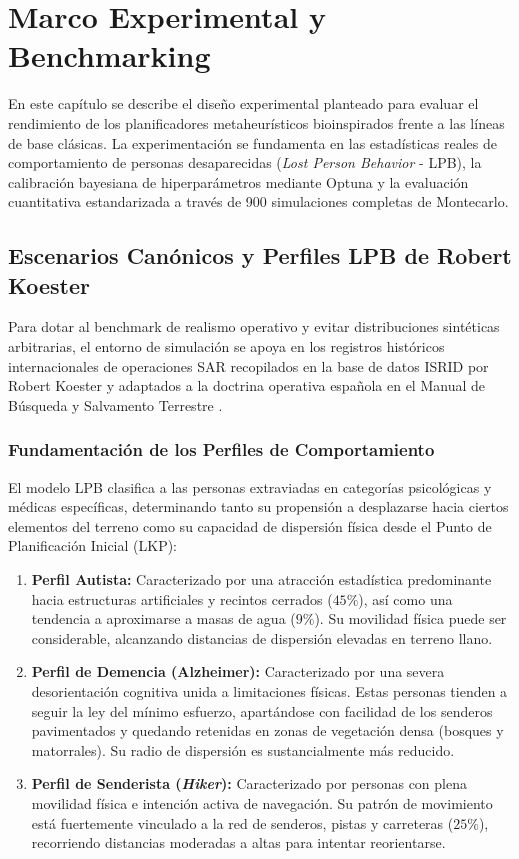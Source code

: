 \chapter{Marco Experimental y Benchmarking}
\label{ch:experimentacion}

En este capítulo se describe el diseño experimental planteado para evaluar el rendimiento de los planificadores metaheurísticos bioinspirados frente a las líneas de base clásicas. La experimentación se fundamenta en las estadísticas reales de comportamiento de personas desaparecidas (\textit{Lost Person Behavior} - LPB), la calibración bayesiana de hiperparámetros mediante Optuna y la evaluación cuantitativa estandarizada a través de 900 simulaciones completas de Montecarlo.

\section{Escenarios Canónicos y Perfiles LPB de Robert Koester}

Para dotar al benchmark de realismo operativo y evitar distribuciones sintéticas arbitrarias, el entorno de simulación se apoya en los registros históricos internacionales de operaciones SAR recopilados en la base de datos ISRID por Robert Koester \cite{koester2008lost} y adaptados a la doctrina operativa española en el Manual de Búsqueda y Salvamento Terrestre \cite{romero2018manual}. 

\subsection{Fundamentación de los Perfiles de Comportamiento}

El modelo LPB clasifica a las personas extraviadas en categorías psicológicas y médicas específicas, determinando tanto su propensión a desplazarse hacia ciertos elementos del terreno como su capacidad de dispersión física desde el Punto de Planificación Inicial (LKP):

\begin{enumerate}
    \item \textbf{Perfil Autista:} Caracterizado por una atracción estadística predominante hacia estructuras artificiales y recintos cerrados ($45\%$), así como una tendencia a aproximarse a masas de agua ($9\%$). Su movilidad física puede ser considerable, alcanzando distancias de dispersión elevadas en terreno llano.
    \item \textbf{Perfil de Demencia (Alzheimer):} Caracterizado por una severa desorientación cognitiva unida a limitaciones físicas. Estas personas tienden a seguir la ley del mínimo esfuerzo, apartándose con facilidad de los senderos pavimentados y quedando retenidas en zonas de vegetación densa (bosques y matorrales). Su radio de dispersión es sustancialmente más reducido.
    \item \textbf{Perfil de Senderista (\textit{Hiker}):} Caracterizado por personas con plena movilidad física e intención activa de navegación. Su patrón de movimiento está fuertemente vinculado a la red de senderos, pistas y carreteras ($25\%$), recorriendo distancias moderadas a altas para intentar reorientarse.
\end{enumerate}

